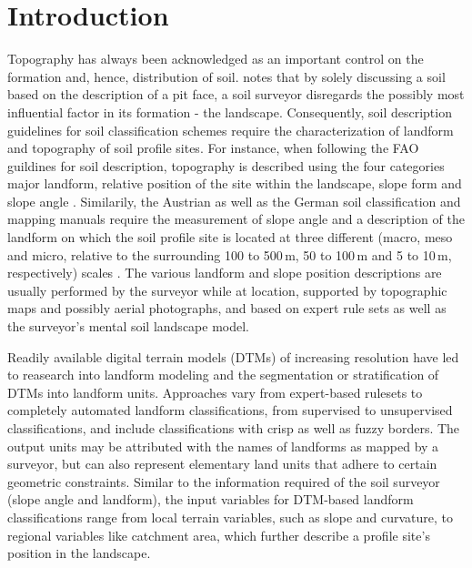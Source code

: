 \documentclass[preprint,12pt,authoryear]{elsarticle}
\begin{document}
\linenumbers

\section{Introduction}
Topography has always been acknowledged as an important control on the formation and, hence, distribution of soil. \cite{Schaetzl2013} notes that by solely discussing a soil based on the description of a pit face, a soil surveyor disregards the possibly most influential factor in its formation - the landscape.	Consequently, soil description guidelines for soil classification schemes require the characterization of landform and topography of soil profile sites. For instance, when following the FAO guildines for soil description, topography is described using the four categories major landform, relative position of the site within the landscape, slope form and slope angle \citep{FAO2006}. Similarily, the Austrian \citep{Nestroy2011} as well as the German soil classification and mapping manuals \citep{ArbeitsgruppeBoden2006} require the measurement of slope angle and a description of the landform on which the soil profile site is located at three different (macro, meso and micro, relative to the surrounding 100 to 500\,m, 50 to 100\,m and 5 to 10\,m, respectively) scales \citep{Englisch1998}. The various landform and slope position descriptions are usually performed by the surveyor while at location, supported by topographic maps and possibly aerial photographs, and based on expert rule sets as well as the surveyor's mental soil landscape model. 

Readily available digital terrain models (DTMs) of increasing resolution have led to reasearch into landform modeling and the segmentation or stratification  of DTMs into landform units. Approaches vary from expert-based rulesets to completely automated landform classifications, from supervised to unsupervised classifications, and include classifications with crisp as well as fuzzy borders.  The output units may be attributed with the names of landforms as mapped by a surveyor, but can also represent elementary land units that adhere to certain geometric constraints. Similar to the information required of the soil surveyor (slope angle and landform), the input variables for DTM-based landform classifications range from local terrain variables, such as slope and curvature, to regional variables like catchment area, which further describe a profile site's position in the landscape.
\end{document}
